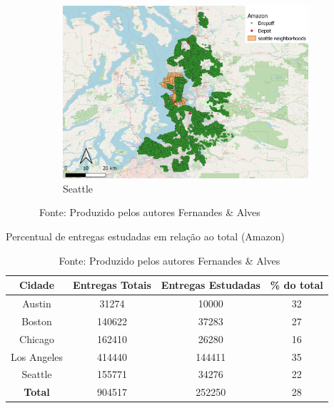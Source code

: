 \begin{figure}[H]
\begin{subfigure}{.32\textwidth}
    \end{subfigure}
    \begin{subfigure}{.32\textwidth}
        \caption{Seattle}
        \includegraphics[width=\textwidth]{images/6_amazon/locations/seattle_locations.png}
    \end{subfigure}
    \caption*{\ Fonte: Produzido pelos autores Fernandes \& Alves}
\end{figure}

\singlespacing
\begin{table}[H]
    \centering
    \caption{Percentual de entregas estudadas em relação ao total (Amazon)}
    \label{tab:mantidos_amazon}
    \begin{tabular}{|c|ccc|}
    \hline
    \multicolumn{1}{|c|}{\textbf{Cidade}} & \multicolumn{1}{c|}{\textbf{Entregas Totais}} & \multicolumn{1}{c|}{\textbf{Entregas Estudadas}} & \textbf{\% do total} \\ \hline
    Austin & 31274 & 10000 & 32 \\
    Boston & 140622 & 37283 & 27 \\
    Chicago & 162410 & 26280 & 16 \\
    Los Angeles & 414440 & 144411 & 35 \\
    Seattle & 155771 & 34276 & 22 \\ \hline
    \textbf{Total} & 904517 & 252250 & 28 \\ \hline
    \end{tabular}
    \caption*{\ Fonte: Produzido pelos autores Fernandes \& Alves}
\end{table}
\onehalfspacing

